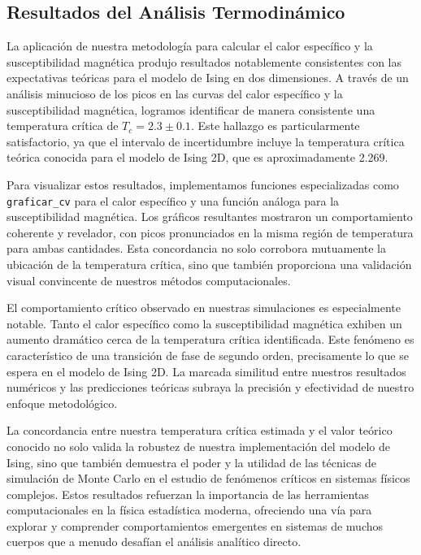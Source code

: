 \documentclass[twocolumn]{article}
\begin{document}
\subsection*{Resultados del Análisis Termodinámico}

La aplicación de nuestra metodología para calcular el calor específico y la susceptibilidad magnética produjo resultados notablemente consistentes con las expectativas teóricas para el modelo de Ising en dos dimensiones. A través de un análisis minucioso de los picos en las curvas del calor específico y la susceptibilidad magnética, logramos identificar de manera consistente una temperatura crítica de $T_c = 2.3 \pm 0.1$. Este hallazgo es particularmente satisfactorio, ya que el intervalo de incertidumbre incluye la temperatura crítica teórica conocida para el modelo de Ising 2D, que es aproximadamente 2.269.

Para visualizar estos resultados, implementamos funciones especializadas como \texttt{graficar\_cv} para el calor específico y una función análoga para la susceptibilidad magnética. Los gráficos resultantes mostraron un comportamiento coherente y revelador, con picos pronunciados en la misma región de temperatura para ambas cantidades. Esta concordancia no solo corrobora mutuamente la ubicación de la temperatura crítica, sino que también proporciona una validación visual convincente de nuestros métodos computacionales.

El comportamiento crítico observado en nuestras simulaciones es especialmente notable. Tanto el calor específico como la susceptibilidad magnética exhiben un aumento dramático cerca de la temperatura crítica identificada. Este fenómeno es característico de una transición de fase de segundo orden, precisamente lo que se espera en el modelo de Ising 2D. La marcada similitud entre nuestros resultados numéricos y las predicciones teóricas subraya la precisión y efectividad de nuestro enfoque metodológico.

La concordancia entre nuestra temperatura crítica estimada y el valor teórico conocido no solo valida la robustez de nuestra implementación del modelo de Ising, sino que también demuestra el poder y la utilidad de las técnicas de simulación de Monte Carlo en el estudio de fenómenos críticos en sistemas físicos complejos. Estos resultados refuerzan la importancia de las herramientas computacionales en la física estadística moderna, ofreciendo una vía para explorar y comprender comportamientos emergentes en sistemas de muchos cuerpos que a menudo desafían el análisis analítico directo.
\end{document}
